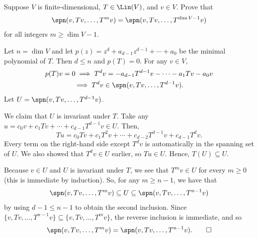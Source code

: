 \begin{exercise}
Suppose $V$ is finite-dimensional, $T\in\Lin(V)$, and $v\in V$. Prove that
\[ \spn(v,Tv,\dots,T^mv)=\spn(v,Tv,\dots,T^{\dim V-1}v) \]
for all integers $m\ge\dim V-1$.
\end{exercise}
\begin{solution}
Let $n=\dim V$ and let $p(z)=z^d+a_{d-1}z^{d-1}+\cdots+a_0$ be the minimal
polynomial of $T$. Then $d\le n$ and $p(T)=0$. For any $v\in V$,
\begin{multline*}
p(T)v=0 \implies T^dv=-a_{d-1}T^{d-1}v-\cdots-a_1Tv-a_0v\\
  \implies T^dv\in\spn(v,Tv,\dots,T^{d-1}v).
\end{multline*}
Let $U=\spn(v,Tv,\dots,T^{d-1}v)$.

We claim that $U$ is invariant under $T$. Take any
$u=c_0v+c_1Tv+\cdots+c_{d-1}T^{d-1}v\in U$. Then,
\[ Tu=c_0Tv+c_1T^2v+\cdots+c_{d-2}T^{d-1}v+c_{d-1}T^dv. \]
Every term on the right-hand side except $T^dv$ is automatically in the
spanning set of $U$. We also showed that $T^dv\in U$ earlier, so $Tu\in U$.
Hence, $T(U)\subseteq U$.

Because $v\in U$ and $U$ is invariant under $T$, we see that $T^mv\in U$ for
every $m\ge0$ (this is immediate by induction). So, for any $m\ge n-1$, we
have that
\[ \spn(v,Tv,\dots,T^mv)\subseteq U\subseteq\spn(v,Tv,\dots,T^{n-1}v) \]
by using $d-1\le n-1$ to obtain the second inclusion. Since
$\{v,Tv,\dots,T^{n-1}v\}\subseteq\{v,Tv,\dots,T^mv\}$, the reverse inclusion
is immediate, and so
\[ \spn(v,Tv,\dots,T^mv)=\spn(v,Tv,\dots,T^{n-1}v). \qedhere \]
\end{solution}

